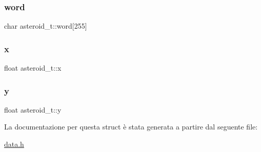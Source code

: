 \subsubsection{\texorpdfstring{word}{word}}
{\footnotesize\ttfamily char asteroid\+\_\+t\+::word\mbox{[}255\mbox{]}}

\mbox{\label{structasteroid__t_af41593baa5b59279f5bf4d7a498826b6}} 
\subsubsection{\texorpdfstring{x}{x}}
{\footnotesize\ttfamily float asteroid\+\_\+t\+::x}

\mbox{\label{structasteroid__t_a28ab3f0bb57149edc6d9833ab72ba1fe}} 
\subsubsection{\texorpdfstring{y}{y}}
{\footnotesize\ttfamily float asteroid\+\_\+t\+::y}



La documentazione per questa struct è stata generata a partire dal seguente file\+:\begin{DoxyCompactItemize}
\item 
\hyperlink{data_8h}{data.\+h}\end{DoxyCompactItemize}
